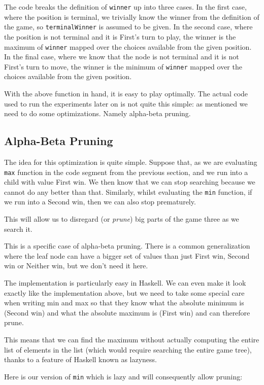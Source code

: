 The code breaks the definition of \texttt{winner} up into three cases.
In the first case, where the position is terminal, we trivially know the winner from the definition of the game, so \texttt{terminalWinner} is assumed to be given.
In the second case, where the position is not terminal and it is First's turn to play, the winner is the maximum of \texttt{winner} mapped over the choices available from the given position.
In the final case, where we know that the node is not terminal and it is not First's turn to move, the winner is the minimum of \texttt{winner} mapped over the choices available from the given position.

With the above function in hand, it is easy to play optimally.
The actual code used to run the experiments later on is not quite this simple: as mentioned we need to do some optimizations.
Namely alpha-beta pruning.

\subsection {Alpha-Beta Pruning}

The idea for this optimization is quite simple.
Suppose that, as we are evaluating \texttt{max} function in the code segment from the previous section, and we run into a child with value First win.
We then know that we can stop searching because we cannot do any better than that.
Similarly, whilst evaluating the \texttt{min} function, if we run into a Second win, then we can also stop prematurely.

This will allow us to disregard (or \emph{prune}) big parts of the game three as we search it.


This is a specific case of alpha-beta pruning.
There is a common generalization where the leaf node can have a bigger set of values than just First win, Second win or Neither win, but we don't need it here.

The implementation is particularly easy in Haskell. We can even make it look exactly like the implementation above, but we need to take some special care when writing min and max so that they know what the absolute minimum is (Second win) and what the absolute maximum is (First win) and can therefore prune.

This means that we can find the maximum without actually computing the entire list of elements in the list (which would require searching the entire game tree), thanks to a feature of Haskell known as lazyness.

Here is our version of \texttt{min} which is lazy and will consequently allow pruning:

